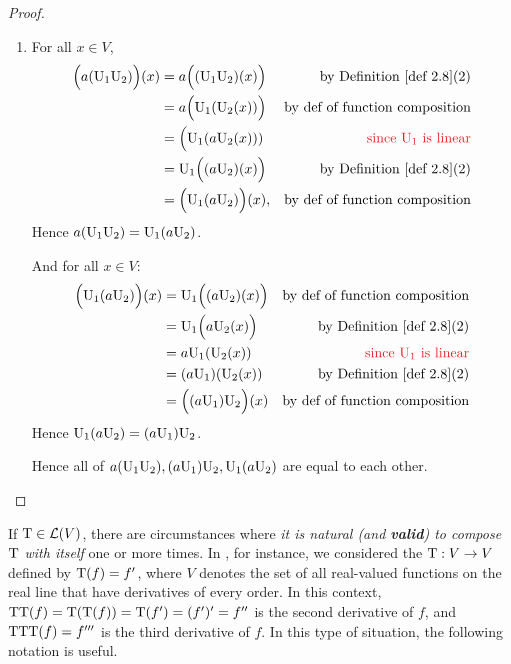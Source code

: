 \begin{proof}
\begin{enumerate}
\item For all \(x \in V\),
\begin{align*}
    \Big( a(\U_1 \U_2) \Big)(x) & = a\Big( (\U_1\U_2)(x) \Big) & \text{by \DEF{2.8}(2)} \\
                                & = a\Big( \U_1(\U_2(x)) \Big) & \text{by def of function composition} \\
                                & = \Big( \U_1(a\U_2(x)) ) & \text{\RED{since \(\U_1\) is linear}} \\
                                & = \U_1 \Big( (a\U_2)(x) \Big) & \text{by \DEF{2.8}(2)} \\
                                & = \Big( \U_1(a\U_2) \Big)(x), & \text{by def of function composition}
\end{align*}
Hence \(a(\mathrm{U}_1\mathrm{U}_2) = \mathrm{U}_1(a\mathrm{U}_2)\).

And for all \(x \in V\):
\begin{align*}
    \Big( \U_1(a\U_2) \Big)(x) & = \U_1 \Big( (a\U_2)(x) \Big) & \text{by def of function composition} \\
                               & = \U_1 \Big( a\U_2(x) \Big) & \text{by \DEF{2.8}(2)} \\
                               & = a\U_1(\U_2(x)) & \text{\RED{since \(\U_1\) is linear}} \\
                               & = (a\U_1)(\U_2(x)) & \text{by \DEF{2.8}(2)} \\
                               & = \Big( (a\U_1)\U_2 \Big)(x) & \text{by def of function composition}
\end{align*}
Hence \(\mathrm{U}_1(a\mathrm{U}_2) = (a\mathrm{U}_1)\mathrm{U}_2\).

Hence all of \(a(\mathrm{U}_1\mathrm{U}_2), (a\mathrm{U}_1)\mathrm{U}_2, \mathrm{U}_1(a\mathrm{U}_2)\) are equal to each other.
\end{enumerate}
\end{proof}

If \(\mathrm{T} \in \mathcal{L}(V)\), there are circumstances where \emph{it is natural (and \textbf{valid}) to compose \(\mathrm{T}\) with itself} one or more times.
In , for instance, we considered the \LTRAN{} \(\mathrm{T} : V \to V\) defined by \(\mathrm{T}(f) = f'\),
where \(V\) denotes the set of all real-valued functions on the real line that have derivatives of every order.
In this context, \(\mathrm{T}\mathrm{T}(f) = \mathrm{T}(\mathrm{T}(f)) = \mathrm{T}(f') = (f')' = f''\) is the second derivative of \(f\), and \(\mathrm{T}\mathrm{T}\mathrm{T}(f) = f'''\) is the third derivative of \(f\).
In this type of situation, the following notation is useful.

